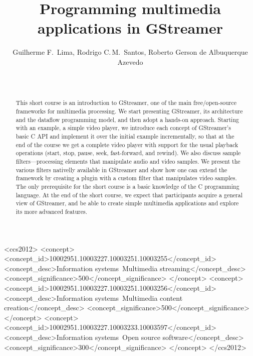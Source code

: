 \documentclass{sig-alternate-05-2015}
\begin{document}

\title{Programming multimedia applications in GStreamer}
\author{
\alignauthor
Guilherme F.~Lima,\;
Rodrigo C.\,M.~Santos,\;
Roberto Gerson de Albuquerque Azevedo\\
\\
\\
}
\maketitle
\begin{abstract}
  This short course is an introduction to GStreamer, one of the main
  free/open-source frameworks for multimedia processing.  We start
  presenting GStreamer, its architecture and the dataflow programming model,
  and then adopt a hands-on approach.  Starting with an example, a simple
  video player, we introduce each concept of GStreamer’s basic C API and
  implement it over the initial example incrementally, so that at the end of
  the course we get a complete video player with support for the usual
  playback operations (start, stop, pause, seek, fast-forward, and rewind).
  We also discuss sample filters---processing elements that manipulate audio
  and video samples.  We present the various filters nativelly available in
  GStreamer and show how one can extend the framework by creating a plugin
  with a custom filter that manipulates video samples.  The only
  prerequisite for the short course is a basic knowledge of the C
  programming language.  At the end of the short course, we expect that
  participants acquire a general view of GStreamer, and be able to create
  simple multimedia applications and explore its more advanced features.
\end{abstract}

 \begin{CCSXML}
<ccs2012>
<concept>
<concept_id>10002951.10003227.10003251.10003255</concept_id>
<concept_desc>Information systems~Multimedia streaming</concept_desc>
<concept_significance>500</concept_significance>
</concept>
<concept>
<concept_id>10002951.10003227.10003251.10003256</concept_id>
<concept_desc>Information systems~Multimedia content creation</concept_desc>
<concept_significance>500</concept_significance>
</concept>
<concept>
<concept_id>10002951.10003227.10003233.10003597</concept_id>
<concept_desc>Information systems~Open source software</concept_desc>
<concept_significance>300</concept_significance>
</concept>
</ccs2012>
\end{CCSXML}
\end{document}
